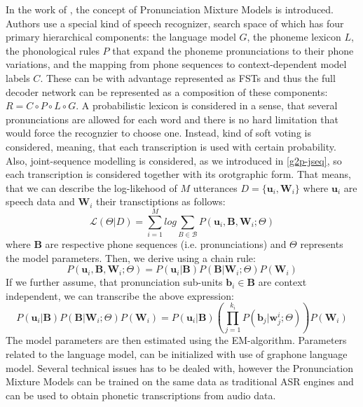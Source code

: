 {In the work of \cite{mcgraw2013learning}, the concept of Pronunciation Mixture Models is introduced.
Authors use a special kind of speech recognizer, search space of which has four primary hierarchical components: the language model $G$, the phoneme lexicon $L$, the phonological rules $P$ that expand the phoneme pronunciations to their phone variations, and the mapping from phone sequences to context-dependent model labels
$C$.
These can be with advantage represented as FSTs and thus the full decoder network can be represented as a composition of these components: $R = C\circ P \circ L \circ G$.
A probabilistic lexicon is considered in a sense, that several pronunciations are allowed for each word and there is no hard limitation that would force the recognzier to choose one.
Instead, kind of soft voting is considered, meaning, that each transcription is used with certain probability.
Also, joint-sequence modelling is considered, as we introduced in \ref{g2p-jseq}, so each transcription is considered together with its orotgraphic form.
That means, that we can describe the log-likehood of $M$ utterances $ D = \{\mathbf{u}_i,\mathbf{W}_i\}$ where $\mathbf{u}_i$ are speech data and $\mathbf{W}_i$ their transctiptions as follows:
\begin{equation}
\mathcal{L}(\Theta\vert D) = \sum_{i=1}^M log \sum_{B \in \mathcal{B}} P(\mathbf{u}_i,\mathbf{B},\mathbf{W}_i;\Theta)
\end{equation}
where $\mathbf{B}$ are respective phone sequences (i.e. pronunciations) and $\Theta$ represents the model parameters.
Then, we derive using a chain rule:
\begin{equation}
P(\mathbf{u}_i,\mathbf{B},\mathbf{W}_i;\Theta) =  P(\mathbf{u}_i\vert\mathbf{B})P(\mathbf{B}\vert\mathbf{W}_i;\Theta)P(\mathbf{W}_i)
\end{equation}
If we further assume, that pronunciation sub-units $\mathbf{b}_i \in \mathbf{B}$ are context independent, we can transcribe the above expression:
\begin{equation}
P(\mathbf{u}_i\vert\mathbf{B})P(\mathbf{B}\vert\mathbf{W}_i;\Theta)P(\mathbf{W}_i) = P(\mathbf{u}_i\vert\mathbf{B})(\prod_{j=1}^{k_i}P(\mathbf{b}_j\vert \mathbf{w}^i_j;\Theta))P(\mathbf{W}_i) 
\end{equation}
The model parameters are then estimated using the EM-algorithm.
Parameters related to the language model, can be initialized with use of graphone language model.
Several technical issues has to be dealed with, however the Pronunciation Mixture Models can be trained on the same data as traditional ASR engines and can be used to obtain phonetic transcriptions from audio data.

}
